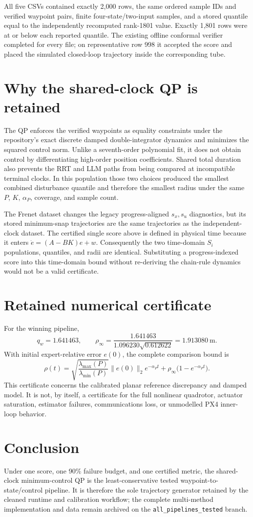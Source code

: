 \documentclass[11pt]{article}
\begin{document}
All five CSVs contained exactly 2,000 rows, the same ordered sample IDs and verified waypoint pairs, finite four-state/two-input samples, and a stored quantile equal to the independently recomputed rank-1801 value.  Exactly 1,801 rows were at or below each reported quantile.  The existing offline conformal verifier completed for every file; on representative row 998 it accepted the score and placed the simulated closed-loop trajectory inside the corresponding tube.

\section*{Why the shared-clock QP is retained}
The QP enforces the verified waypoints as equality constraints under the repository's exact discrete damped double-integrator dynamics and minimizes the squared control norm.  Unlike a seventh-order polynomial fit, it does not obtain control by differentiating high-order position coefficients.  Shared total duration also prevents the RRT and LLM paths from being compared at incompatible terminal clocks.  In this population those two choices produced the smallest combined disturbance quantile and therefore the smallest radius under the same $P$, $K$, $\alpha_P$, coverage, and sample count.

The Frenet dataset changes the legacy progress-aligned $s_x,s_u$ diagnostics, but its stored minimum-snap trajectories are the same trajectories as the independent-clock dataset.  The certified single score above is defined in physical time because it enters $\dot e=(A-BK)e+w$.  Consequently the two time-domain $S_i$ populations, quantiles, and radii are identical.  Substituting a progress-indexed score into this time-domain bound without re-deriving the chain-rule dynamics would not be a valid certificate.

\section*{Retained numerical certificate}
For the winning pipeline,
\[
q_w=1.641463,\qquad
\rho_\infty=
\frac{1.641463}{1.096230\sqrt{0.612622}}
=1.913080\ \mathrm{m}.
\]
With initial expert-relative error $e(0)$, the complete comparison bound is
\[
\rho(t)=
\sqrt{\frac{\lambda_{\max}(P)}{\lambda_{\min}(P)}}
\lVert e(0)\rVert_2e^{-\alpha_Pt}
+\rho_\infty\bigl(1-e^{-\alpha_Pt}\bigr).
\]
This certificate concerns the calibrated planar reference discrepancy and damped model.  It is not, by itself, a certificate for the full nonlinear quadrotor, actuator saturation, estimator failures, communications loss, or unmodelled PX4 inner-loop behavior.

\section*{Conclusion}
Under one score, one 90\% failure budget, and one certified metric, the shared-clock minimum-control QP is the least-conservative tested waypoint-to-state/control pipeline.  It is therefore the sole trajectory generator retained by the cleaned runtime and calibration workflow; the complete multi-method implementation and data remain archived on the \texttt{all\_pipelines\_tested} branch.
\end{document}
